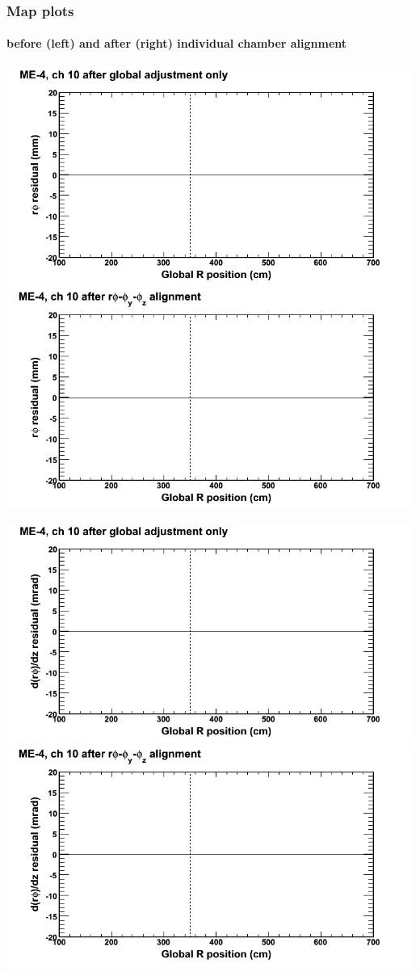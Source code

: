 \documentclass[compress]{beamer}
\begin{document}
\begin{frame}
\frametitle{Map plots}
\framesubtitle{before (left) and after (right) individual chamber alignment}
\includegraphics[width=0.5\linewidth]{ringmapplots_3dof/before_CSCvsr_mem4ch10_x.png} \includegraphics[width=0.5\linewidth]{ringmapplots_3dof/after_CSCvsr_mem4ch10_x.png}

\includegraphics[width=0.5\linewidth]{ringmapplots_3dof/before_CSCvsr_mem4ch10_dxdz.png} \includegraphics[width=0.5\linewidth]{ringmapplots_3dof/after_CSCvsr_mem4ch10_dxdz.png}
\end{frame}
\end{document}
